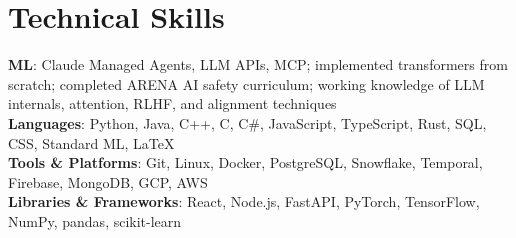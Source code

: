 \documentclass[letterpaper,11pt]{article}
\begin{document}
\section{Technical Skills}
 \begin{itemize}[leftmargin=0.15in, label={}]
    \small{\item{
     \textbf{ML}{: Claude Managed Agents, LLM APIs, MCP; implemented transformers from scratch; completed ARENA AI safety curriculum; working knowledge of LLM internals, attention, RLHF, and alignment techniques} \\
     \textbf{Languages}{: Python, Java, C++, C, C\#, JavaScript, TypeScript, Rust, SQL, CSS, Standard ML, \LaTeX} \\
     \textbf{Tools \& Platforms}{: Git, Linux, Docker, PostgreSQL, Snowflake, Temporal, Firebase, MongoDB, GCP, AWS} \\
     \textbf{Libraries \& Frameworks}{: React, Node.js, FastAPI, PyTorch, TensorFlow, NumPy, pandas, scikit-learn}
    }}
 \end{itemize}
\end{document}
